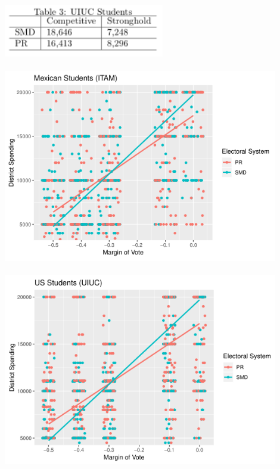 \documentclass{article}
\begin{document}
\includegraphics[width=70mm]{Coefficients_UIUC}\\
\\
\includegraphics[width=120mm]{Interactive_ITAM}\\
\\
\includegraphics[width=120mm]{Interactive_UIUC}\\
\end{document}

